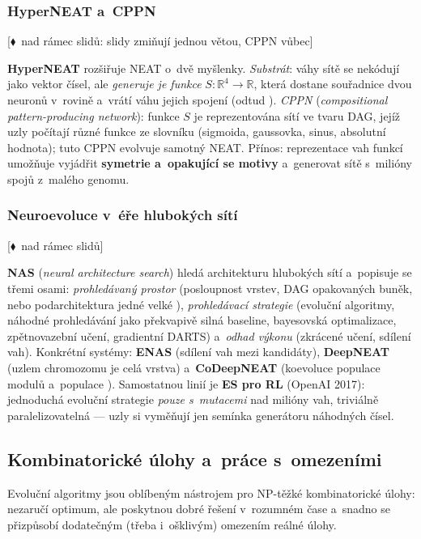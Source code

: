 \documentclass[11pt,a4paper]{article}
\theoremstyle{definition}
\newcommand{\mimo}{\textcolor{markcol}{\textsf{\footnotesize[$\blacklozenge$~nad rámec slidů]}}}
\newcommand{\mimoq}[1]{\textcolor{markcol}{\textsf{\footnotesize[$\blacklozenge$~nad rámec slidů: #1]}}}
\begin{document}
\subsubsection{HyperNEAT a~CPPN}

\noindent\mimoq{slidy zmiňují jednou větou, CPPN vůbec}

\textbf{HyperNEAT} rozšiřuje NEAT o~dvě myšlenky. \emph{Substrát}: váhy sítě se nekódují
jako vektor čísel, ale \emph{generuje je funkce} $S : \mathbb{R}^4 \to \mathbb{R}$, která
dostane souřadnice dvou neuronů v~rovině a~vrátí váhu jejich spojení (odtud ).
\emph{CPPN} (\emph{compositional pattern-producing network}): funkce $S$ je reprezentována
sítí ve tvaru DAG, jejíž uzly počítají různé funkce ze slovníku (sigmoida, gaussovka, sinus,
absolutní hodnota); tuto CPPN evolvuje samotný NEAT. Přínos: reprezentace vah funkcí umožňuje
vyjádřit \textbf{symetrie a~opakující se motivy} a~generovat sítě s~milióny spojů z~malého
genomu.

\subsubsection{Neuroevoluce v~éře hlubokých sítí}

\noindent\mimo{}

\textbf{NAS} (\emph{neural architecture search}) hledá architekturu hlubokých sítí a~popisuje
se třemi osami: \emph{prohledávaný prostor} (posloupnost vrstev, DAG opakovaných buněk, nebo
podarchitektura jedné velké ), \emph{prohledávací strategie} (evoluční
algoritmy, náhodné prohledávání jako překvapivě silná baseline, bayesovská optimalizace,
zpětnovazební učení, gradientní DARTS) a~\emph{odhad výkonu} (zkrácené učení, sdílení vah).
Konkrétní systémy: \textbf{ENAS} (sdílení vah mezi kandidáty), \textbf{DeepNEAT} (uzlem
chromozomu je celá vrstva) a~\textbf{CoDeepNEAT} (koevoluce populace modulů a~populace
). Samostatnou linií je \textbf{ES pro RL} (OpenAI 2017): jednoduchá evoluční
strategie \emph{pouze s~mutacemi} nad milióny vah, triviálně paralelizovatelná --- uzly si
vyměňují jen semínka generátoru náhodných čísel.

\subsection{Kombinatorické úlohy a~práce s~omezeními}
\label{sec:kombi}

Evoluční algoritmy jsou oblíbeným nástrojem pro NP-těžké kombinatorické úlohy:
nezaručí optimum, ale poskytnou dobré řešení v~rozumném čase a~snadno se
přizpůsobí dodatečným (třeba i~ošklivým) omezením reálné úlohy.
\end{document}
